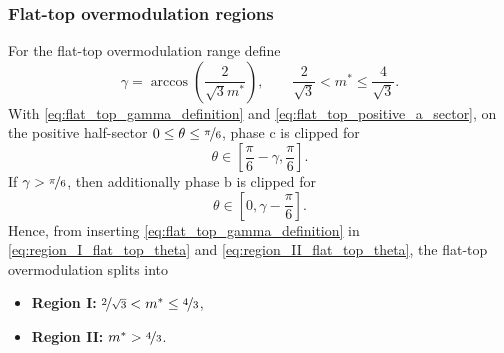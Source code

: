 \begin{frame}
    \frametitle{Flat-top overmodulation regions}
    For the flat-top overmodulation range define
    \begin{equation}
        \gamma=\arccos\!\left(\frac{2}{\sqrt{3}m^*}\right),
        \qquad
        \frac{2}{\sqrt{3}}<m^*\leq \frac{4}{\sqrt{3}}.
        \label{eq:flat_top_gamma_definition}
    \end{equation}\pause
    With \eqref{eq:flat_top_gamma_definition} and \eqref{eq:flat_top_positive_a_sector}, on the positive half-sector \(0\leq \theta\leq \nicefrac{\pi}{6}\), phase \(\mathrm{c}\) is clipped for
    \begin{equation}
        \theta\in\left[\frac{\pi}{6}-\gamma,\frac{\pi}{6}\right].
        \label{eq:region_I_flat_top_theta}
    \end{equation}\pause
    If \(\gamma>\nicefrac{\pi}{6}\), then additionally phase \(\mathrm{b}\) is clipped for
    \begin{equation}
        \theta\in\left[0,\gamma-\frac{\pi}{6}\right].
        \label{eq:region_II_flat_top_theta}
    \end{equation}\pause
    Hence, from inserting \eqref{eq:flat_top_gamma_definition} in \eqref{eq:region_I_flat_top_theta} and \eqref{eq:region_II_flat_top_theta}, the flat-top overmodulation splits into
    \begin{itemize}
        \item \textbf{Region I:} \(\nicefrac{2}{\sqrt{3}}<m^*\leq \nicefrac{4}{3}\),
        \item \textbf{Region II:} \(m^*>  \nicefrac{4}{3}\).
    \end{itemize}
\end{frame}

